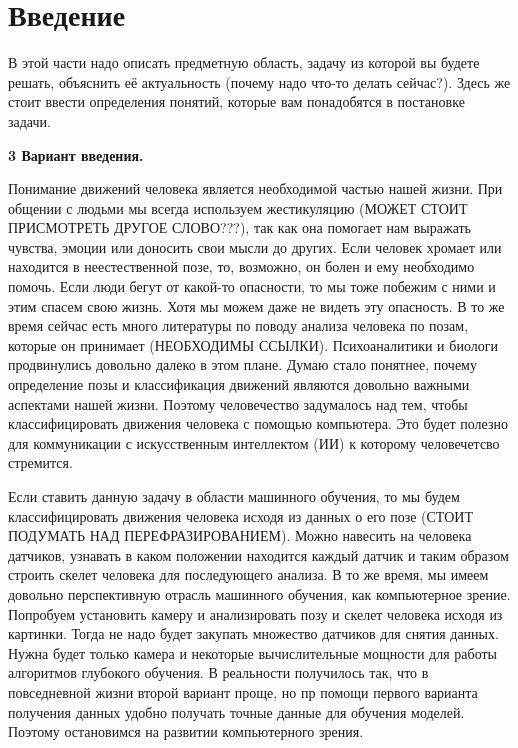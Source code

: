 \section{Введение}
\label{sec:Chapter0} 

В этой части надо описать предметную область, задачу из которой вы будете решать, объяснить её актуальность (почему надо что-то делать сейчас?).
Здесь же стоит ввести определения понятий, которые вам понадобятся в постановке задачи.

\hfill \break
\textbf{\Large 3 Вариант введения.}

Понимание движений человека является необходимой частью нашей жизни. При общении с людьми мы всегда используем жестикуляцию (МОЖЕТ СТОИТ ПРИСМОТРЕТЬ ДРУГОЕ СЛОВО???), так как она помогает нам выражать чувства, эмоции или доносить свои мысли до других. Если человек хромает или находится в неестественной позе, то, возможно, он болен и ему необходимо помочь. Если люди бегут от какой-то опасности, то мы тоже побежим с ними и этим спасем свою жизнь. Хотя мы можем даже не видеть эту опасность. В то же время сейчас есть много литературы по поводу анализа человека по позам, которые он принимает (НЕОБХОДИМЫ ССЫЛКИ). Психоаналитики и биологи продвинулись довольно далеко в этом плане. Думаю стало понятнее, почему определение позы и классификация движений являются довольно важными аспектами нашей жизни. Поэтому человечество задумалось над тем, чтобы классифицировать движения человека с помощью компьютера. Это будет полезно для коммуникации с искусственным интеллектом (ИИ) к которому человечетсво стремится.

Если ставить данную задачу в области машинного обучения, то мы будем классифицировать движения человека исходя из данных о его позе (СТОИТ ПОДУМАТЬ НАД ПЕРЕФРАЗИРОВАНИЕМ). Можно навесить на человека датчиков, узнавать в каком положении находится каждый датчик и таким образом строить скелет человека для последующего анализа. В то же время, мы имеем довольно перспективную отрасль машинного обучения, как компьютерное зрение. Попробуем установить камеру и анализировать позу и скелет человека исходя из картинки. Тогда не надо будет закупать множество датчиков для снятия данных. Нужна будет только камера и некоторые вычислительные мощности для работы алгоритмов глубокого обучения. В реальности получилось так, что в повседневной жизни второй вариант проще, но пр помощи первого варианта получения данных удобно получать точные данные для обучения моделей. Поэтому остановимся на развитии компьютерного зрения.

